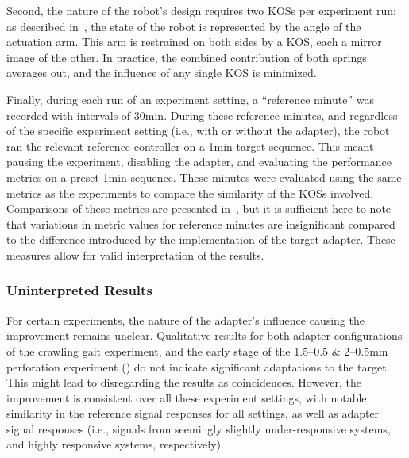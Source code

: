Second, the nature of the robot's design requires two KOSs per experiment run: as described in~, the state of the robot is represented by the angle of the actuation arm.
This arm is restrained on both sides by a KOS, each a mirror image of the other.
In practice, the combined contribution of both springs averages out, and the influence of any single KOS is minimized.

Finally, during each run of an experiment setting, a ``reference minute'' was recorded with intervals of 30\si{\minute}.
During these reference minutes, and regardless of the specific experiment setting (i.e., with or without the adapter), the robot ran the relevant reference controller on a 1\si{\minute} target sequence.
This meant pausing the experiment, disabling the adapter, and evaluating the performance metrics on a preset 1\si{\minute} sequence.
These minutes were evaluated using the same metrics as the experiments to compare the similarity of the KOSs involved.
Comparisons of these metrics are presented in~, but it is sufficient here to note that variations in metric values for reference minutes are insignificant compared to the difference introduced by the implementation of the target adapter.
These measures allow for valid interpretation of the results.

\subsubsection{Uninterpreted Results}
For certain experiments, the nature of the adapter's influence causing the improvement remains unclear.
Qualitative results for both adapter configurations of the crawling gait experiment, and the early stage of the 1.5--0.5 \& 2--0.5\si{\mm} perforation experiment () do not indicate significant adaptations to the target.
This might lead to disregarding the results as coincidences.
However, the improvement is consistent over all these experiment settings, with notable similarity in the reference signal responses for all settings, as well as adapter signal responses (i.e., signals from seemingly slightly under-responsive systems, and highly responsive systems, respectively).
